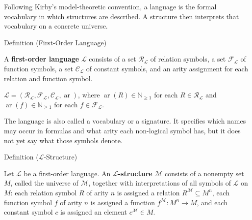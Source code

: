 
\begin{remark*}[Exposition]
Following Kirby's model-theoretic convention, a language is the formal
vocabulary in which structures are described. A structure then interprets that
vocabulary on a concrete universe.
\end{remark*}

\begin{definitionbox}{Definition (First-Order Language)}
\begin{definition}\label{def:first-order-language}
A \textbf{first-order language} $\mathcal{L}$ consists of a set
$\mathcal{R}_{\mathcal{L}}$ of relation symbols, a set
$\mathcal{F}_{\mathcal{L}}$ of function symbols, a set
$\mathcal{C}_{\mathcal{L}}$ of constant symbols, and an arity assignment for
each relation and function symbol.
\end{definition}
\end{definitionbox}

\begin{remark*}
$\mathcal{L}=(\mathcal{R}_{\mathcal{L}},\mathcal{F}_{\mathcal{L}},
\mathcal{C}_{\mathcal{L}},\operatorname{ar})$, where
$\operatorname{ar}(R)\in\mathbb{N}_{\geq 1}$ for each
$R\in\mathcal{R}_{\mathcal{L}}$ and
$\operatorname{ar}(f)\in\mathbb{N}_{\geq 1}$ for each
$f\in\mathcal{F}_{\mathcal{L}}$.
\end{remark*}

\begin{remark*}[Interpretation]
The language is also called a vocabulary or a signature. It specifies which
names may occur in formulas and what arity each non-logical symbol has, but it
does not yet say what those symbols denote.
\end{remark*}

\DefinitionalRoot

\begin{definitionbox}{Definition ($\mathcal{L}$-Structure)}
\begin{definition}\label{def:l-structure}
Let $\mathcal{L}$ be a first-order language. An
\textbf{$\mathcal{L}$-structure} $\mathcal{M}$ consists of a nonempty set
$M$, called the universe of $\mathcal{M}$, together with interpretations of
all symbols of $\mathcal{L}$ on $M$: each relation symbol $R$ of arity $n$ is
assigned a relation $R^{\mathcal{M}}\subseteq M^n$, each function symbol $f$
of arity $n$ is assigned a function $f^{\mathcal{M}}\colon M^n\to M$, and
each constant symbol $c$ is assigned an element $c^{\mathcal{M}}\in M$.
\end{definition}
\end{definitionbox}

